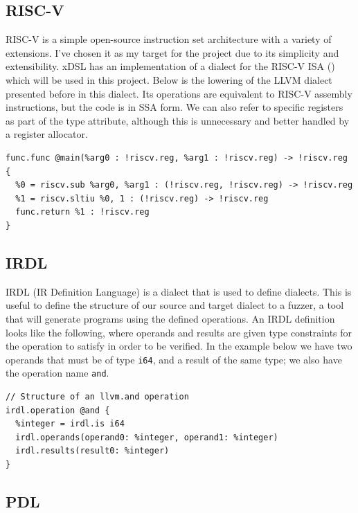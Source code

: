 \subsection*{RISC-V}

RISC-V is a simple open-source instruction set architecture with a variety of extensions.
I've chosen it as my target for the project due to its simplicity and extensibility. 
xDSL has an implementation of a dialect for the RISC-V ISA (\cite{riscv-dialect}) 
which will be used in this project.
%
Below is the lowering of the LLVM dialect presented before in this dialect. Its operations
are equivalent to RISC-V assembly instructions, but the code is in SSA form.
We can also refer to specific registers as part of the type attribute, although this
is unnecessary and better handled by a register allocator.

\begin{verbatim}
func.func @main(%arg0 : !riscv.reg, %arg1 : !riscv.reg) -> !riscv.reg {
  %0 = riscv.sub %arg0, %arg1 : (!riscv.reg, !riscv.reg) -> !riscv.reg
  %1 = riscv.sltiu %0, 1 : (!riscv.reg) -> !riscv.reg
  func.return %1 : !riscv.reg
}
\end{verbatim}

\subsection*{IRDL}

IRDL (IR Definition Language) \cite{irdl} is a dialect that is used to define dialects.
This is useful to define the structure of our source and target dialect to a fuzzer,
a tool that will generate programs using the defined operations. An IRDL definition looks
like the following, where operands and results are given type constraints for the operation
to satisfy in order to be verified. In the example below we have two operands that must be
of type \texttt{i64}, and a result of the same type; we also have the operation name \texttt{and}.
\begin{verbatim}
// Structure of an llvm.and operation
irdl.operation @and {
  %integer = irdl.is i64
  irdl.operands(operand0: %integer, operand1: %integer)
  irdl.results(result0: %integer)
}
\end{verbatim}
\subsection*{PDL}

